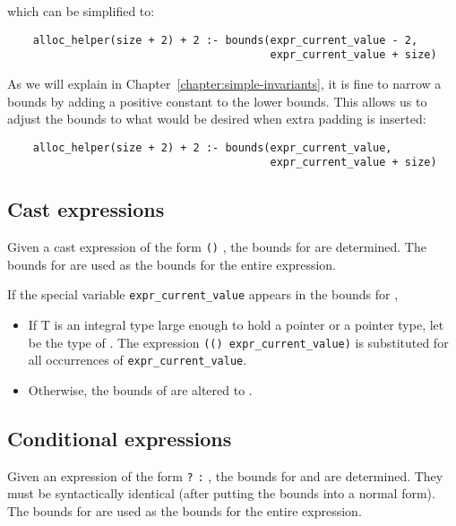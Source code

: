 which can be simplified to:

\begin{verbatim}
    alloc_helper(size + 2) + 2 :- bounds(expr_current_value - 2, 
                                         expr_current_value + size)
\end{verbatim}

As we will explain in Chapter~\ref{chapter:simple-invariants}, 
it is fine to narrow a bounds by
adding a positive constant to the lower bounds. This allows us to adjust
the bounds to what would be desired when extra padding is inserted:

\begin{verbatim}
    alloc_helper(size + 2) + 2 :- bounds(expr_current_value, 
                                         expr_current_value + size)
\end{verbatim}

\subsection{Cast expressions}

Given a cast expression of the form \texttt{()} ,
the bounds for  are determined. The bounds for
 are used as the bounds for the entire expression.

If the special variable \texttt{expr\_current\_value} appears in the
bounds for ,

\begin{itemize}
\item
  If T is an integral type large enough to hold a pointer or a pointer
  type, let  be the type of . The expression
  \texttt{(() expr\_current\_value)} is substituted for
  all occurrences of \texttt{expr\_current\_value}.
\item
  Otherwise, the bounds of  are  altered to \boundsnone.
\end{itemize}
  
\subsection{Conditional expressions}

Given an expression of the form  \texttt{?} 
\texttt{:} , the bounds for  and  are
determined. They must be syntactically identical (after putting the
bounds into a normal form). The bounds for  are used as the
bounds for the entire expression.

